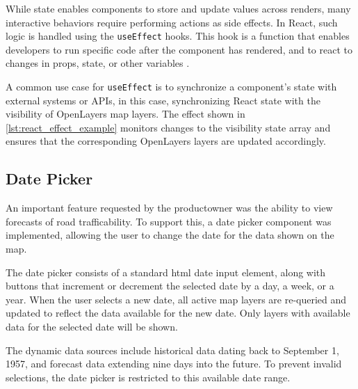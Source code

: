\begin{figure}[h]

\end{figure}

While state enables components to store and update values across renders, many interactive behaviors require performing actions as side effects. In React, such logic is handled using the \texttt{useEffect} hooks. This hook is a function that enables developers to run specific code after the component has rendered, and to react to changes in props, state, or other variables \cite{react_useEffect}.

A common use case for \texttt{useEffect} is to synchronize a component's state with external systems or APIs, in this case, synchronizing React state with the visibility of OpenLayers map layers. The effect shown in \autoref{lst:react_effect_example} monitors changes to the visibility state array and ensures that the corresponding OpenLayers layers are updated accordingly.

\begin{figure}[h]

\end{figure}

\subsection{Date Picker}

An important feature requested by the \gls{productowner} was the ability to view forecasts of road trafficability. To support this, a date picker component was implemented, allowing the user to change the date for the data shown on the map.

The date picker consists of a standard \acrshort{html} date input element, along with buttons that increment or decrement the selected date by a day, a week, or a year. When the user selects a new date, all active map layers are re-queried and updated to reflect the data available for the new date. Only layers with available data for the selected date will be shown.

The dynamic data sources include historical data dating back to September 1, 1957, and forecast data extending nine days into the future. To prevent invalid selections, the date picker is restricted to this available date range.

